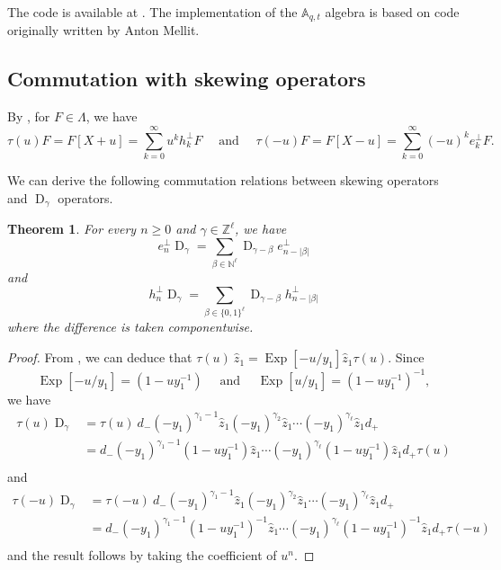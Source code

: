 \documentclass[reqno]{amsart}
\theoremstyle{plain}
\newtheorem{theorem}{Theorem}[section]
\theoremstyle{definition}
\theoremstyle{remark}
\DeclareMathOperator{\D}{D}
\DeclareMathOperator{\Exp}{Exp}
\newcommand{\A}{\mathbb{A}}%
\newcommand{\z}{\widehat{z}}
\newcommand{\<}{\langle}
\renewcommand{\>}{\rangle}
\begin{document}
The code is available at \cite[{\texttt{benchmarks.ipynb}}]{Iraci2026Code}. The implementation of the $\A_{q,t}$ algebra is based on code originally written by Anton Mellit.


\subsection{Commutation with skewing operators}

By , for $F \in \Lambda$, we have
\[ \tau(u) F = F[X+u] = \sum_{k=0}^\infty u^k h_k^\perp F \quad \text{ and } \quad \tau(-u) F = F[X-u] = \sum_{k=0}^\infty (-u)^k e_k^\perp F. \]

We can derive the following commutation relations between skewing operators and $\D_\gamma$ operators.

\begin{theorem}
    For every $n \geq 0$ and $\gamma\in \mathbb{Z}^\ell$, we have
    \begin{equation}
        e_n^\perp \D_\gamma = \sum_{\beta \in \mathbb{N}^\ell} \D_{\gamma-\beta} e_{n-\lvert \beta \rvert}^\perp
    \end{equation}
    and
    \begin{equation}
        h_n^\perp \D_\gamma = \sum_{\beta \in \{0,1\}^\ell} \D_{\gamma-\beta} h_{n-\lvert \beta \rvert}^\perp
    \end{equation}
    where the difference is taken componentwise.
\end{theorem}

\begin{proof}
    From , we can deduce that $\tau(u)\ \z_1 = \Exp[-u/y_1] \z_1 \tau(u)$. Since
    \[ \Exp[-u/y_1] = (1 - u y_1^{-1}) \quad \text{ and } \quad \Exp[u/y_1] = (1 - u y_1^{-1})^{-1}, \]
    we have
    \begin{align*}
        \tau(u) \D_\gamma & = \tau(u)\ d_- (-y_1)^{\gamma_{1}-1} \z_1 (-y_1)^{\gamma_{2}} \z_1 \cdots (-y_1)^{\gamma_{\ell}} \z_1 d_+ \\
        & = d_- (-y_1)^{\gamma_{1}-1} (1 - uy_1^{-1}) \z_1 \cdots (-y_1)^{\gamma_{\ell}} (1 - uy_1^{-1}) \z_1 d_+ \tau(u) \\
    \end{align*}
    and
    \begin{align*}
        \tau(-u) \D_\gamma & = \tau(-u)\ d_- (-y_1)^{\gamma_{1}-1} \z_1 (-y_1)^{\gamma_{2}} \z_1 \cdots (-y_1)^{\gamma_{\ell}} \z_1 d_+ \\
        & = d_- (-y_1)^{\gamma_{1}-1} (1 - uy_1^{-1})^{-1} \z_1 \cdots (-y_1)^{\gamma_{\ell}} (1 - uy_1^{-1})^{-1} \z_1 d_+ \tau(-u) \\
    \end{align*}
    and the result follows by taking the coefficient of $u^n$.
\end{proof}
\end{document}
